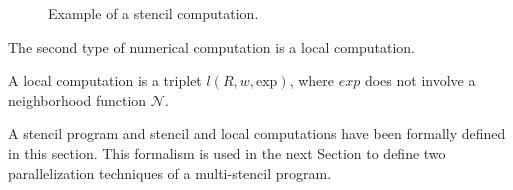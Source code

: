 \begin{figure}[!h]\begin{center}
  \caption{Example of a stencil computation.}
  \label{fig:ex}
\end{center}\end{figure}

The second type of numerical computation is a local computation.
\begin{mydef}
A local computation is a triplet $l(R,w,\text{exp})$, where $exp$ does not involve a neighborhood function $\mathcal{N}$.
\end{mydef}

A stencil program and stencil and local computations have been formally defined in this section. This formalism is used in the next Section to define two parallelization techniques of a multi-stencil program.


